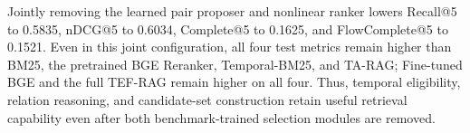\begin{table}[t]
\caption{TEF-RAG ablation results on the test split.}
\label{tab:ablation_results}
\centering
\small
\setlength{\tabcolsep}{3pt}
\end{table}

Jointly removing the learned pair proposer and nonlinear ranker lowers Recall@5 to 0.5835, nDCG@5 to 0.6034, Complete@5 to 0.1625, and FlowComplete@5 to 0.1521. Even in this joint configuration, all four test metrics remain higher than BM25, the pretrained BGE Reranker, Temporal-BM25, and TA-RAG; Fine-tuned BGE and the full TEF-RAG remain higher on all four. Thus, temporal eligibility, relation reasoning, and candidate-set construction retain useful retrieval capability even after both benchmark-trained selection modules are removed.

